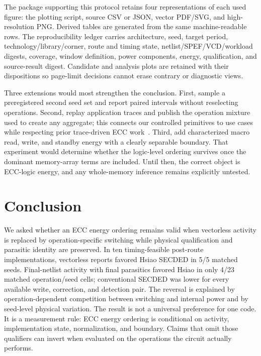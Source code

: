 \documentclass[conference,10pt]{IEEEtran}
\begin{document}
The package supporting this protocol retains four representations of each used figure: the plotting script, source CSV or JSON, vector PDF/SVG, and high-resolution PNG. Derived tables are generated from the same machine-readable rows. The reproducibility ledger carries architecture, seed, target period, technology/library/corner, route and timing state, netlist/SPEF/VCD/workload digests, coverage, window definition, power components, energy, qualification, and source-result digest. Candidate and analysis plots are retained with their dispositions so page-limit decisions cannot erase contrary or diagnostic views.

Three extensions would most strengthen the conclusion. First, sample a preregistered second seed set and report paired intervals without reselecting operations. Second, replay application traces and publish the operation mixture used to create any aggregate; this connects our controlled primitives to use cases while respecting prior trace-driven ECC work~\cite{ghosh2004}. Third, add characterized macro read, write, and standby energy with a clearly separable boundary. That experiment would determine whether the logic-level ordering survives once the dominant memory-array terms are included. Until then, the correct object is ECC-logic energy, and any whole-memory inference remains explicitly untested.

\section{Conclusion}
We asked whether an ECC energy ordering remains valid when vectorless activity is replaced by operation-specific switching while physical qualification and parasitic identity are preserved. In ten timing-feasible post-route implementations, vectorless reports favored Hsiao SECDED in 5/5 matched seeds. Final-netlist activity with final parasitics favored Hsiao in only 4/23 matched operation/seed cells; conventional SECDED was lower for every available write, correction, and detection pair. The reversal is explained by operation-dependent competition between switching and internal power and by seed-level physical variation. The result is not a universal preference for one code. It is a measurement rule: ECC energy ordering is conditional on activity, implementation state, normalization, and boundary. Claims that omit those qualifiers can invert when evaluated on the operations the circuit actually performs.

\clearpage
\balance


\end{document}

